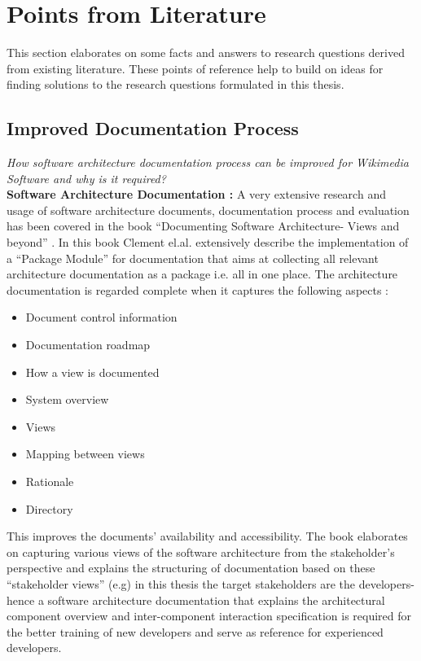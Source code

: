 \section{Points from Literature} 
\indent This section elaborates on some facts and answers to research questions derived from existing literature. These points of reference help to build on ideas for finding solutions to the research questions formulated in this thesis.
\subsection{Improved Documentation Process}
\indent \emph{How software architecture documentation process can be improved for
Wikimedia Software and why is it required?}
\newline
\\\indent \textbf{Software Architecture Documentation : } A very extensive research and usage of software architecture documents, documentation process and evaluation has been covered in the book \enquote{Documenting Software Architecture- Views and beyond} \cite{BachmannDocumentingSoftware2010}. In this book Clement el.al. extensively describe the implementation of a \enquote{Package Module} for documentation that aims at collecting all relevant architecture documentation as a package i.e. all in one place. The architecture documentation is regarded complete when it captures the following aspects :
\begin{itemize}
\item Document control information 
\item Documentation roadmap 
\item How a view is documented
\item System overview 
\item Views 
\item Mapping between views 
\item Rationale
\item Directory
\end{itemize}
This improves the documents' availability and accessibility. The book
elaborates on capturing various views of the software architecture from the stakeholder's perspective and explains the structuring of documentation based on these \enquote{stakeholder views} (e.g) in this thesis the target stakeholders are the developers- hence a software architecture documentation that explains the architectural component overview and inter-component interaction specification is required for the better training of new developers and serve as reference for experienced developers.
